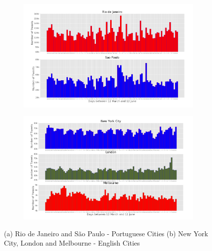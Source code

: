 \begin{figure}[htbp]
	\centering
	\begin{subfigure}[htbp]{0.8\textwidth}
		\includegraphics[width=\linewidth]{figures/rio_sp_whole_months.png}
		\caption{}
		\label{subfig:portuguese_cities_whole_months} 
	\end{subfigure}
	
	\begin{subfigure}[htbp]{0.8\textwidth}
		\includegraphics[width=\linewidth]{figures/nyc_london_melbourne_whole_months.png}
		\caption{}
		\label{subfig:english_cities_whole_months}
	\end{subfigure}
	
	\caption[Two numerical solutions]{(a) Rio de Janeiro and São Paulo - Portuguese Cities (b) New York City, London and Melbourne - English Cities}
	\label{fig:daily_distribution}
\end{figure}

